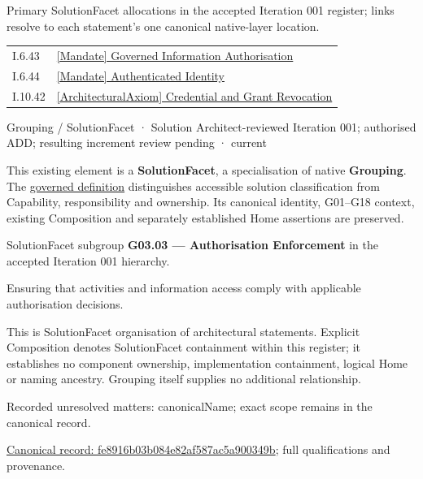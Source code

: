 Primary SolutionFacet allocations in the accepted Iteration 001 register; links resolve to each statement’s one canonical native-layer location.\par
\begin{longtable}{p{.22\linewidth}p{.73\linewidth}}
I.6.43 & \hyperref[element:8812fcd52d3f4afcbeef41b60bda5874]{[Mandate] Governed Information Authorisation} \\
I.6.44 & \hyperref[element:72b6d13c85944e2d93efc6c5f5a53d82]{[Mandate] Authenticated Identity} \\
I.10.42 & \hyperref[element:370d9a6e0e00402aba9720580a2e365e]{[ArchitecturalAxiom] Credential and Grant Revocation} \\
\end{longtable}
\label{element:fe8916b03b084e82af587ac5a900349b}
{\small Grouping / SolutionFacet · Solution Architect-reviewed Iteration 001; authorised ADD; resulting increment review pending · current}\par

This existing element is a \textbf{SolutionFacet}, a specialisation of native
\textbf{Grouping}. The \href{\detokenize{../../../../../../../governance/continuum-representation.md#solutionfacet-classification--1119-candidate}}{governed definition}
distinguishes accessible solution classification from Capability, responsibility
and ownership. Its canonical identity, G01–G18 context, existing Composition
and separately established Home assertions are preserved.



SolutionFacet subgroup \textbf{G03.03 — Authorisation Enforcement} in the accepted Iteration 001 hierarchy.



Ensuring that activities and information access comply with applicable authorisation decisions.



This is SolutionFacet organisation of architectural statements. Explicit Composition denotes SolutionFacet containment within this register; it establishes no component ownership, implementation containment, logical Home or naming ancestry. Grouping itself supplies no additional relationship.


{\small Recorded unresolved matters: canonicalName; exact scope remains in the canonical record.}\par
{\footnotesize \href{../../../../../../../continuum/grouping/fe8916b03b084e82af587ac5a900349b.md}{Canonical record: fe8916b03b084e82af587ac5a900349b}; full qualifications and provenance.}\par
